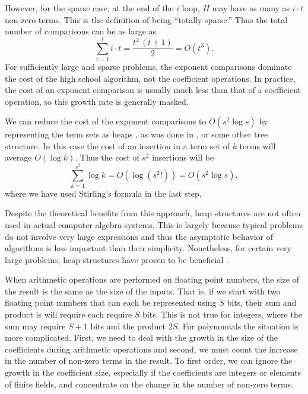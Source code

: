However, for the sparse case, at the end of the $i$\th{} loop, $H$ may
have as many as $i\cdot t$ non-zero terms.  This is the definition of
being ``totally sparse.'' Thus the
total number of comparisons can be as large as
\[
\sum_{i=1}^{t} i\cdot t = \frac{t^2\,(t+1)}{2} = O(t^3).
\]
For sufficiently large and sparse problems, the exponent comparisons
dominate the cost of the high school algorithm, not the coefficient
operations.  In practice, the cost of an exponent comparison is
usually much less than that of a coefficient operation, so this growth
rate is generally masked.

We can reduce the cost of the exponent comparisons to $O(s^{2} \log
s)$ by representing the term sets as heaps
\cite{Aho:Hopcroft:Ullman74}, as was done in \Altran{}
\cite{Brown:ALTRAN}, or some other tree structure.  In this case the
cost of an insertion in a term set of $k$ terms will average $O(\log
k)$. Thus the cost of $s^{2}$ insertions will be
\[
\sum_{k=1}^{s^{2}} \log k = O(\log (s^{2}!)) = O(s^{2} \log s),
\]
where we have used Stirling's formula  in the
last step.

Despite the theoretical benefits from this approach, heap structures
are not often used in actual computer algebra systems.  This is
largely because typical problems do not involve very large expressions
and thus the asymptotic behavior of algorithms is less important than
their simplicity.  Nonetheless, for certain very large problems, heap
structures have proven to be beneficial \cite{Y2n:Problem}.

\label{Poly:Density:Sec}

When arithmetic operations are performed on floating point numbers,
the size of the result is the same as the size of the inputs.  That
is, if we start with two floating point numbers that can each be
represented using $S$ bits, their sum and product is will require each
require $S$ bits.  This is not true for integers, where the sum may
require $S+1$ bits and the product $2S$.  For polynomials the
situation is more complicated.  First, we need to deal with the growth
in the size of the coefficients during arithmetic operations and
second, we must count the increase in the number of non-zero terms in
the result.  To first order, we can ignore the growth in the
coefficient size, especially if the coefficients are integers or
elements of finite fields, and concentrate on the change in the number
of non-zero terms.

